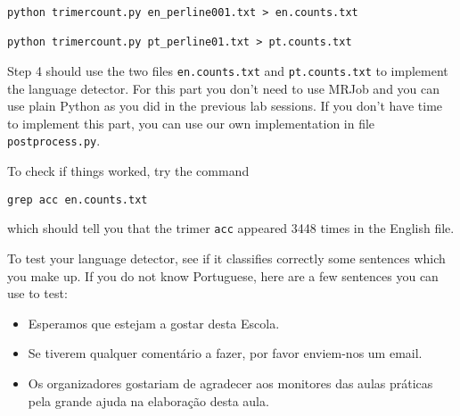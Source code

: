 %
%

\begin{verbatim}
python trimercount.py en_perline001.txt > en.counts.txt

python trimercount.py pt_perline01.txt > pt.counts.txt
\end{verbatim}

Step 4 should use the two files \texttt{en.counts.txt} and \texttt{pt.counts.txt} to implement the language detector. For this part you don't need to use MRJob and you can use plain Python as you did in the previous lab sessions. If you don't have time to implement this part, you can use our own implementation in file \texttt{postprocess.py}.

\iffalse
After you've managed to get things working on one machine only, you can easily run steps 1-3 on AWS:

%

\begin{verbatim}
python trimercount.py -r emr en_perline001.txt > en.counts.txt

python trimercount.py -r emr pt_perline01.txt > pt.counts.txt
\end{verbatim}
\fi

To check if things worked, try the command

\begin{verbatim}
grep acc en.counts.txt
\end{verbatim}

which should tell you that the trimer \texttt{acc} appeared 3448 times in the English file.

To test your language detector, see if it classifies correctly some sentences which you make up. If you do not know Portuguese, here are a few sentences you can use to test:

\begin{itemize}
\item Esperamos que estejam a gostar desta Escola.
\item Se tiverem qualquer coment\'{a}rio a fazer, por favor enviem-nos um email.
\item Os organizadores gostariam de agradecer aos monitores das aulas pr\'{a}ticas pela grande ajuda na elabora\c{c}\~{a}o desta aula.
\end{itemize}

